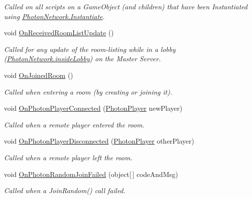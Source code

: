 \begin{DoxyCompactItemize}
\begin{DoxyCompactList}\small\item\em Called on all scripts on a Game\+Object (and children) that have been Instantiated using \hyperlink{class_photon_network_a843d9f62d28ab123c83291c1e6bb857d}{Photon\+Network.\+Instantiate}. \end{DoxyCompactList}\item 
void \hyperlink{interface_i_pun_callbacks_ad3e808558f778aec6b12e950d9632506}{On\+Received\+Room\+List\+Update} ()
\begin{DoxyCompactList}\small\item\em Called for any update of the room-\/listing while in a lobby (\hyperlink{class_photon_network_a8ad64b1a76c7918bbe5642639afff458}{Photon\+Network.\+inside\+Lobby}) on the Master Server. \end{DoxyCompactList}\item 
void \hyperlink{interface_i_pun_callbacks_a113daf6c35e118aff8daa5537d8c1c6c}{On\+Joined\+Room} ()
\begin{DoxyCompactList}\small\item\em Called when entering a room (by creating or joining it). \end{DoxyCompactList}\item 
void \hyperlink{interface_i_pun_callbacks_a14eede4f84e088008e59fe63efb8775d}{On\+Photon\+Player\+Connected} (\hyperlink{class_photon_player}{Photon\+Player} new\+Player)
\begin{DoxyCompactList}\small\item\em Called when a remote player entered the room. \end{DoxyCompactList}\item 
void \hyperlink{interface_i_pun_callbacks_aa200001beb114a07eac4b9442e2b793e}{On\+Photon\+Player\+Disconnected} (\hyperlink{class_photon_player}{Photon\+Player} other\+Player)
\begin{DoxyCompactList}\small\item\em Called when a remote player left the room. \end{DoxyCompactList}\item 
void \hyperlink{interface_i_pun_callbacks_ac0d022a7c6abd23f0039efec687eb0dc}{On\+Photon\+Random\+Join\+Failed} (object\mbox{[}$\,$\mbox{]} code\+And\+Msg)
\begin{DoxyCompactList}\small\item\em Called when a Join\+Random() call failed. \end{DoxyCompactList}\item 

\end{DoxyCompactItemize}
